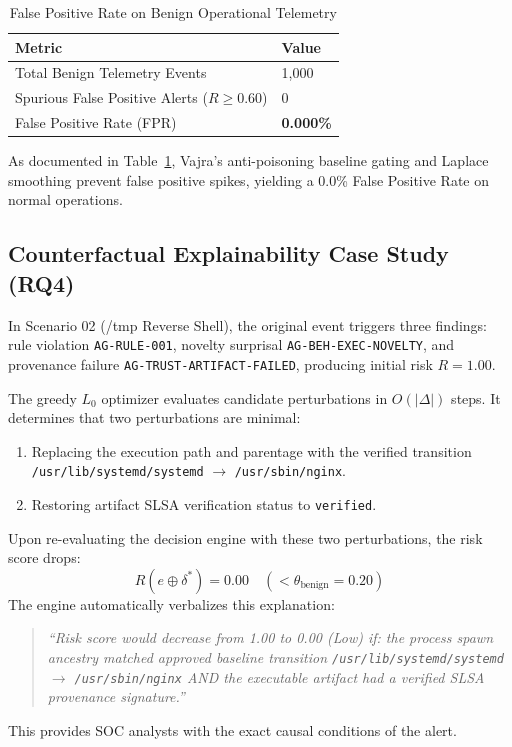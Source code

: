 \documentclass[conference]{IEEEtran}
\begin{document}
\begin{table}[h]
\centering
\caption{False Positive Rate on Benign Operational Telemetry}
\label{tab:fpr}
\begin{tabular}{@{}ll@{}}
\toprule
\textbf{Metric} & \textbf{Value} \\ \midrule
Total Benign Telemetry Events & 1,000 \\
Spurious False Positive Alerts ($R \ge 0.60$) & 0 \\
False Positive Rate (FPR) & \textbf{0.000\%} \\ \bottomrule
\end{tabular}
\end{table}

As documented in Table~\ref{tab:fpr}, Vajra's anti-poisoning baseline gating and Laplace smoothing prevent false positive spikes, yielding a 0.0\% False Positive Rate on normal operations.

\subsection{Counterfactual Explainability Case Study (RQ4)}
In Scenario 02 (/tmp Reverse Shell), the original event triggers three findings: rule violation \texttt{AG-RULE-001}, novelty surprisal \texttt{AG-BEH-EXEC-NOVELTY}, and provenance failure \texttt{AG-TRUST-ARTIFACT-FAILED}, producing initial risk $R = 1.00$.

The greedy $L_0$ optimizer evaluates candidate perturbations in $O(|\Delta|)$ steps. It determines that two perturbations are minimal:
\begin{enumerate}
    \item Replacing the execution path and parentage with the verified transition \texttt{/usr/lib/systemd/systemd} $\to$ \texttt{/usr/sbin/nginx}.
    \item Restoring artifact SLSA verification status to \texttt{verified}.
\end{enumerate}

Upon re-evaluating the decision engine with these two perturbations, the risk score drops:
\begin{equation}
R(e \oplus \delta^*) = 0.00 \quad (< \theta_{\text{benign}} = 0.20)
\end{equation}
The engine automatically verbalizes this explanation:
\begin{quote}
\textit{``Risk score would decrease from 1.00 to 0.00 (Low) if: the process spawn ancestry matched approved baseline transition \texttt{/usr/lib/systemd/systemd} $\to$ \texttt{/usr/sbin/nginx} AND the executable artifact had a verified SLSA provenance signature.''}
\end{quote}
This provides SOC analysts with the exact causal conditions of the alert.
\end{document}
